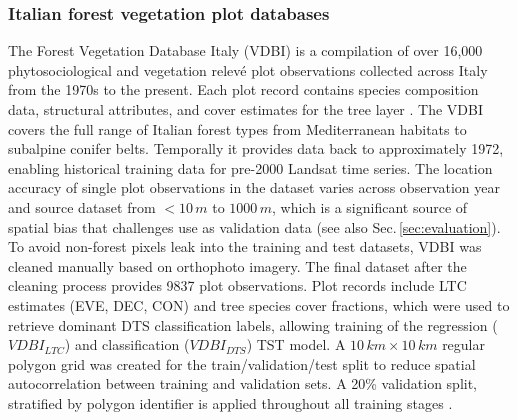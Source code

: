 \documentclass[essd, manuscript]{copernicus}
\begin{document}
\subsubsection{Italian forest vegetation plot databases}
\label{sec:vdbi}
The Forest Vegetation Database Italy (VDBI) is a compilation of over 16,000 phytosociological and vegetation relevé plot observations collected across Italy from the 1970s to the present. Each plot record contains species composition data, structural attributes, and cover estimates for the tree layer \citep{alessi_ancient_2019}. The VDBI covers the full range of Italian forest types from Mediterranean habitats to subalpine conifer belts. Temporally it provides data back to approximately 1972, enabling historical training data for pre-2000 Landsat time series. The location accuracy of single plot observations in the dataset varies across observation year and source dataset from $<10\,\unit{m}$ to $1000\,\unit{m}$, which is a significant source of spatial bias that challenges use as validation data (see also Sec.\,\ref{sec:evaluation}). To avoid non-forest pixels leak into the training and test datasets, VDBI was cleaned manually based on orthophoto imagery. The final dataset after the cleaning process provides 9837 plot observations. Plot records include LTC estimates (EVE, DEC, CON) and tree species cover fractions, which were used to retrieve dominant DTS classification labels, allowing training of the regression ($VDBI_{LTC}$) and classification ($VDBI_{DTS}$) TST model. A $10\,\unit{km} \times 10\,\unit{km}$ regular polygon grid was created for the train/validation/test split to reduce spatial autocorrelation between training and validation sets. A 20\% validation split, stratified by polygon identifier  is applied throughout all training stages \citep{safonova_ten_2023}.
\end{document}
